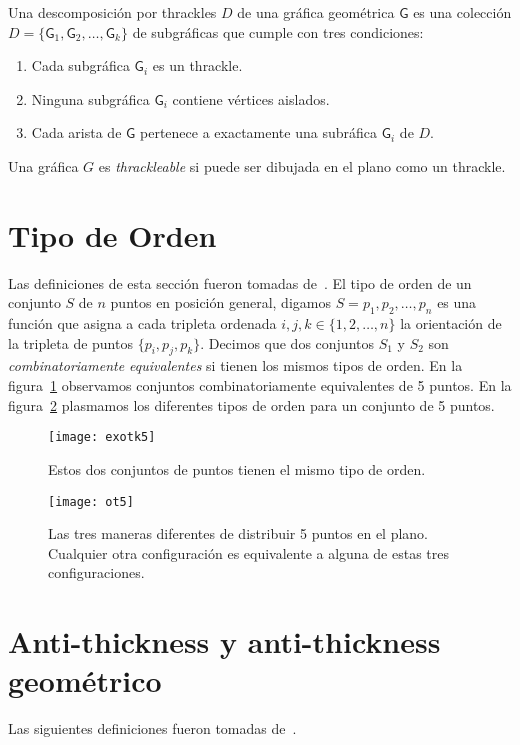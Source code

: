 Una descomposición por thrackles $D$ de una gráfica geométrica
$\mathsf{G}$ es una colección $D=\{\mathsf{G}_1,\mathsf{G}_2,\dots,\mathsf{G}_k\}$
de subgráficas que cumple con tres condiciones:
\begin{enumerate}
  \item Cada subgráfica $\mathsf{G}_i$ es un thrackle.
  \item Ninguna subgráfica $\mathsf{G}_i$ contiene vértices aislados.
  \item Cada arista de $\mathsf{G}$ pertenece a exactamente una subráfica $\mathsf{G}_i$ de $D$.
\end{enumerate}

Una gráfica $G$ es \emph{thrackleable} si puede ser dibujada en el plano como un thrackle.
\section{Tipo de Orden}
Las definiciones de esta sección fueron tomadas de~\cite{Aichholzer2002}.
El tipo de orden de un conjunto $S$ de $n$ puntos en posición general, digamos
$S={p_1,p_2,\dots,p_n}$ es una función que asigna a cada tripleta ordenada
$i,j,k \in \{1,2,\dots,n\}$ la orientación de la tripleta de puntos $\{p_i,p_j,p_k\}$.
Decimos que dos conjuntos $S_1$ y $S_2$ son \emph{combinatoriamente equivalentes} si
tienen los mismos tipos de orden. En la figura~\ref{fig:exotk5} observamos conjuntos
combinatoriamente equivalentes de 5 puntos. En la figura~\ref{fig:ot5}
plasmamos los diferentes tipos de orden para un conjunto de 5 puntos.

\begin{figure}[htpb]
  \centering
  \texttt{[image: exotk5]}
  \caption{Estos dos conjuntos de puntos tienen el mismo tipo de orden.}
  \label{fig:exotk5}
\end{figure}
\begin{figure}[htpb]
  \centering
  \texttt{[image: ot5]}
  \caption{Las tres maneras diferentes de distribuir 5 puntos en el plano. Cualquier
  otra configuración es equivalente a alguna de estas tres configuraciones.}
  \label{fig:ot5}
\end{figure}

\section{Anti-thickness y anti-thickness geométrico}
Las siguientes definiciones fueron tomadas de~\cite{Dujmovic2017}.

